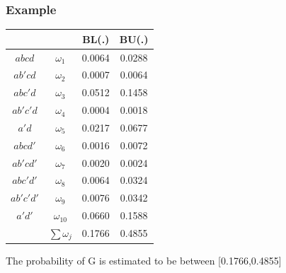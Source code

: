 \documentclass{beamer}
\begin{document}
\begin{frame}
\frametitle{Example}
    \begin{center}
    \begin{tabular}{|c|c|c|c|}
\hline
      & & BL(.) & BU(.)\\
      \hline
     $abcd$ & $\omega_1$ & 0.0064 & 0.0288  \\
     \hline
     $ab'cd$ & $\omega_2$ & 0.0007 & 0.0064 \\
     \hline
      $abc'd$ & $\omega_3$ & 0.0512 & 0.1458 \\
     \hline
      $ab'c'd$ & $\omega_4$ & 0.0004 & 0.0018  \\
     \hline
      $a'd$ & $\omega_5$ & 0.0217 & 0.0677  \\
     \hline
      $abcd'$ & $\omega_6$ & 0.0016 & 0.0072 \\
     \hline
      $ab'cd'$ & $\omega_7$ & 0.0020 & 0.0024 \\
     \hline
      $abc'd'$ & $\omega_8$ & 0.0064 & 0.0324  \\
     \hline
      $ab'c'd'$ & $\omega_9$ & 0.0076 & 0.0342 \\
     \hline
      $a'd'$ & $\omega_{10}$ & 0.0660 & 0.1588   \\
     \hline
     & $\sum \omega_j$& 0.1766 & 0.4855\\
     \hline
\end{tabular}
\end{center}
The probability of G is estimated to be between [0.1766,0.4855]
\end{frame}
\end{document}

